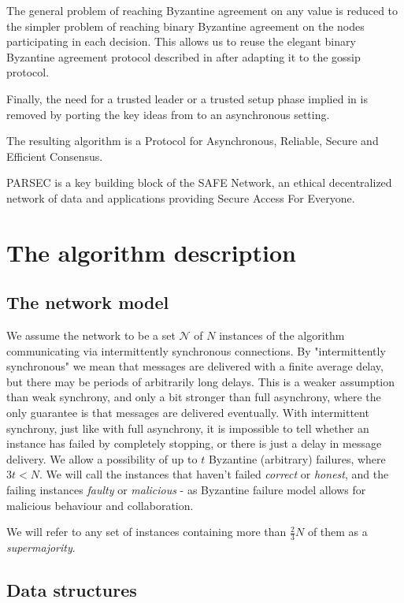 \documentclass[a4paper,fleqn]{article}
\begin{document}
The general problem of reaching Byzantine agreement on any value is reduced to the simpler problem
of reaching binary Byzantine agreement on the nodes participating in each decision. This allows us
to reuse the elegant binary Byzantine agreement protocol described in \cite{aba} after adapting it
to the gossip protocol.

Finally, the need for a trusted leader or a trusted setup phase implied in \cite{aba} is removed by
porting the key ideas from \cite{trivial} to an asynchronous setting.

The resulting algorithm is a Protocol for Asynchronous, Reliable, Secure and Efficient Consensus.

PARSEC is a key building block of the SAFE Network, an ethical decentralized network of data and
applications providing Secure Access For Everyone.

\section{The algorithm description}

\subsection{The network model}

We assume the network to be a set $\mathcal{N}$ of $N$ instances of the algorithm communicating via
intermittently synchronous connections. By "intermittently synchronous" we mean that messages are
delivered with a finite average delay, but there may be periods of arbitrarily long delays. This is
a weaker assumption than weak synchrony, and only a bit stronger than full asynchrony, where the
only guarantee is that messages are delivered eventually.
With intermittent synchrony, just like with full asynchrony, it is impossible to tell whether an
instance has failed by completely stopping, or there is just a delay in message delivery.
We allow a possibility of up to $t$ Byzantine (arbitrary) failures, where $3t < N$. We will call
the instances that haven't failed \emph{correct} or \emph{honest}, and the failing instances
\emph{faulty} or \emph{malicious} - as Byzantine failure model allows for malicious behaviour and 
collaboration.

We will refer to any set of instances containing more than $\frac{2}{3}N$ of them as a
\emph{supermajority}.

\subsection{Data structures}
\end{document}
